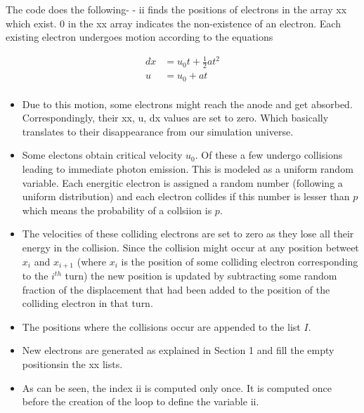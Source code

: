 \documentclass[a4paper, 11pt, margin= 1.25cm]{article}
\begin{document}
\begin{multicols}{2}
    The code does the following- - ii finds the positions of electrons in
the array xx which exist. $0$ in the xx array indicates the
non-existence of an electron. Each existing electron undergoes motion
according to the equations


\begin{align}
dx &= u_0t + \frac{1}{2}at^2\\
u &= u_0 + at\\
\end{align}

\begin{itemize}
\itemsep1pt\parskip0pt
\item
  Due to this motion, some electrons might reach the anode and get
  absorbed. Correspondingly, their xx, u, dx values are set to zero.
  Which basically translates to their disappearance from our simulation
  universe.
\item
  Some electons obtain critical velocity $u_0$. Of these a few undergo
  collisions leading to immediate photon emission. This is modeled as a
  uniform random variable. Each energitic electron is assigned a random
  number (following a uniform distribution) and each electron collides
  if this number is lesser than $p$ which means the probability of a
  collsiion is $p$.
\item
  The velocities of these colliding electrons are set to zero as they
  lose all their energy in the collision. Since the collision might
  occur at any position betweet $x_i$ and $x_{i+1}$ (where $x_i$ is the
  position of some colliding electron corresponding to the $i^{th}$
  turn) the new position is updated by subtracting some random fraction
  of the displacement that had been added to the position of the
  colliding electron in that turn.
\item
  The positions where the collisions occur are appended to the list $I$.
\item
  New electrons are generated as explained in Section 1 and fill the
  empty positionsin the xx lists.
\item 
  As can be seen, the index ii is computed only once. It is computed once before the creation of the loop to define the variable ii. 
\end{itemize}
\end{multicols}
\end{document}
